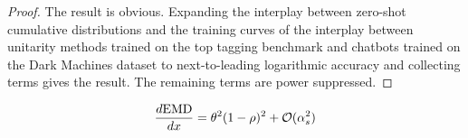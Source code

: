 \begin{proof}
The result is obvious. Expanding the interplay between zero-shot
cumulative distributions and the training curves of the interplay
between unitarity methods trained on the top tagging benchmark and
chatbots trained on the Dark Machines dataset to next-to-leading
logarithmic accuracy and collecting terms gives the result. The
remaining terms are power suppressed.
\end{proof}

\begin{equation}
  \frac{d \mathrm{EMD}}{d x} = {\theta}^{2} (1 - \rho)^{2} + \mathcal{O}(\alpha_s^{2})
  \label{eq:3}
\end{equation}


